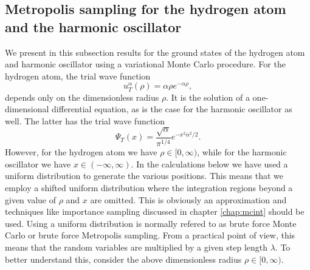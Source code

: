\subsection{Metropolis sampling for the hydrogen atom and the harmonic oscillator}
We present in this subsection results for the ground states
of the hydrogen atom and harmonic oscillator using a variational 
Monte Carlo procedure. For the hydrogen atom, the trial wave function 
\[
     u_T^{\alpha}(\rho)=\alpha\rho e^{-\alpha\rho},
\]
depends only on the dimensionless radius $\rho$. It is the solution
of a one-dimensional differential equation, as is the case
for the harmonic oscillator as well. The latter has the trial
wave function 
\[
\Psi_T(x)=\frac{\sqrt{\alpha}}{\pi^{1/4}}e^{-x^2\alpha^2/2}.
\]
However, for the hydrogen atom we have $\rho\in [0,\infty)$, while
for the harmonic oscillator we have $x\in (-\infty, \infty)$.  In the calculations below
we have used a uniform distribution to generate the various positions. This means that we employ a shifted
uniform distribution where the integration regions beyond a given value of $\rho$ and $x$ are omitted.
This is obviously an approximation and techniques like importance sampling discussed in chapter \ref{chap:mcint}
should be used.  Using a uniform distribution is 
normally refered to as brute force Monte Carlo or brute force
Metropolis sampling.  From a practical point of view, this means that the random variables are multiplied 
by a given step length $\lambda$.  To better understand this, consider the above dimensionless radius $\rho\in [0,\infty)$.

